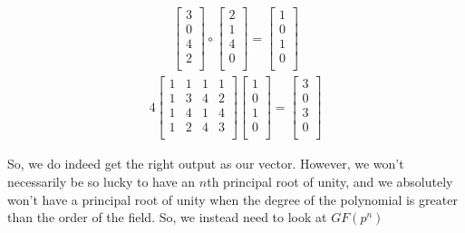 \documentclass{article}
\begin{document}
\begin{align*}
    \begin{bmatrix}
        3 \\
        0 \\
        4 \\
        2 \\
    \end{bmatrix}\circ
    \begin{bmatrix}
        2 \\
        1 \\
        4 \\
        0 \\
    \end{bmatrix}=
    \begin{bmatrix}
        1 \\
        0 \\
        1 \\
        0 \\
    \end{bmatrix}
\end{align*}
\begin{align*}
    4
    \begin{bmatrix}
        1 & 1 & 1 & 1 \\
        1 & 3 & 4 & 2 \\
        1 & 4 & 1 & 4 \\
        1 & 2 & 4 & 3 \\
    \end{bmatrix}
    \begin{bmatrix}
        1 \\
        0 \\
        1 \\
        0 \\
    \end{bmatrix}=
    \begin{bmatrix}
        3 \\
        0 \\
        3 \\
        0 \\
    \end{bmatrix}
\end{align*}

So, we do indeed get the right output as our vector.
However, we won't necessarily be so lucky to have an $n$th principal root of unity, and we absolutely won't have a principal root of unity when the degree of the polynomial is greater than the order of the field. So, we instead need to look at $GF(p^n)$
\end{document}
